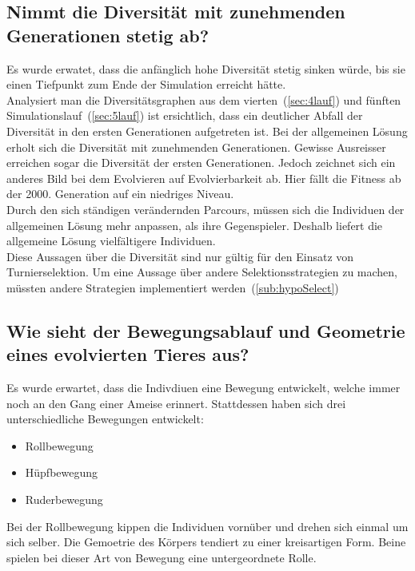     \subsection{Nimmt die Diversität mit zunehmenden Generationen stetig ab?}

      Es wurde erwatet, dass die anfänglich hohe Diversität stetig sinken würde,
      bis sie einen Tiefpunkt zum Ende der Simulation erreicht hätte.
      \\
      Analysiert man die Diversitätsgraphen aus dem vierten~(\vref{sec:4lauf}) und
      fünften Simulationslauf~(\vref{sec:5lauf}) ist ersichtlich,
      dass ein deutlicher Abfall der Diversität in den ersten Generationen aufgetreten ist.
      Bei der allgemeinen Lösung erholt sich die Diversität mit zunehmenden Generationen.
      Gewisse Ausreisser erreichen sogar die Diversität der ersten Generationen.
      Jedoch zeichnet sich ein anderes Bild bei dem Evolvieren auf Evolvierbarkeit ab.
      Hier fällt die Fitness ab der 2000. Generation auf ein niedriges Niveau.
      \\
      Durch den sich ständigen verändernden Parcours,
      müssen sich die Individuen der allgemeinen Lösung mehr anpassen, als ihre Gegenspieler.
      Deshalb liefert die allgemeine Lösung vielfältigere Individuen.
      \\
      Diese Aussagen über die Diversität sind nur gültig für den Einsatz von Turnierselektion.
      Um eine Aussage über andere Selektionsstrategien zu machen,
      müssten andere Strategien implementiert werden~(\vref{sub:hypoSelect})

    \subsection{Wie sieht der Bewegungsablauf und Geometrie eines evolvierten Tieres aus?}

      Es wurde erwartet, dass die Indivdiuen eine Bewegung entwickelt,
      welche immer noch an den Gang einer Ameise erinnert.
      Stattdessen haben sich drei unterschiedliche Bewegungen entwickelt:

      \begin{itemize}
        \item Rollbewegung
        \item Hüpfbewegung
        \item Ruderbewegung
      \end{itemize}

      Bei der Rollbewegung kippen die Individuen vornüber und drehen sich einmal um sich selber.
      Die Gemoetrie des Körpers tendiert zu einer kreisartigen Form.
      Beine spielen bei dieser Art von Bewegung eine untergeordnete Rolle.

